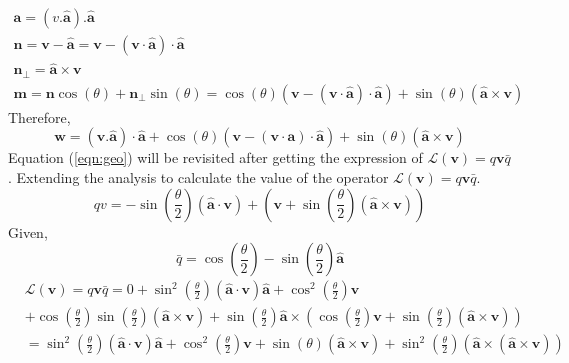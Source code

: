 \begin{equation*}
    \begin{gathered}
\boldsymbol{a}=(v . \widehat{\boldsymbol{a}}) . \widehat{\boldsymbol{a}} \\
\boldsymbol{n}=\boldsymbol{v}-\widehat{\boldsymbol{a}}=\boldsymbol{v}-(\boldsymbol{v} \cdot \widehat{\boldsymbol{a}}) \cdot \widehat{\boldsymbol{a}} \\
\boldsymbol{n}_{\perp}=\widehat{\boldsymbol{a}} \times \boldsymbol{v} \\
\boldsymbol{m}=\boldsymbol{n} \cos (\theta)+\boldsymbol{n}_{\perp} \sin (\theta)=\cos (\theta)(\boldsymbol{v}-(\boldsymbol{v} \cdot \widehat{\boldsymbol{a}}) \cdot \widehat{\boldsymbol{a}})+\sin (\theta)(\widehat{\boldsymbol{a}} \times \boldsymbol{v})
    \end{gathered}
\end{equation*}
Therefore,
\begin{equation}\label{eqn:geo}
    \boldsymbol{w}=(\boldsymbol{v} . \widehat{\boldsymbol{a}}) \cdot \widehat{\boldsymbol{a}}+\cos (\theta)(\boldsymbol{v}-(\boldsymbol{v} \cdot \boldsymbol{a}) \cdot \widehat{\boldsymbol{a}})+\sin (\theta)(\widehat{\boldsymbol{a}} \times \boldsymbol{v})
\end{equation}
Equation (\ref{eqn:geo}) will be revisited after getting the expression of $\mathcal{L}(\boldsymbol{v})=q\boldsymbol{v}\bar{q}$.
Extending the analysis to calculate the value of the operator $\mathcal{L}(\boldsymbol{v})=q\boldsymbol{v}\bar{q}$.
\begin{equation}
q v=-\sin \left(\frac{\theta}{2}\right)(\widehat{\boldsymbol{a}} \cdot \boldsymbol{v})+\left(\boldsymbol{v}+\sin \left(\frac{\theta}{2}\right)(\widehat{\boldsymbol{a}} \times \boldsymbol{v})\right)
\end{equation}
Given,
\begin{equation}
    \bar{q}=\cos \left(\frac{\theta}{2}\right)-\sin \left(\frac{\theta}{2}\right) \widehat{\boldsymbol{a}}
\end{equation}
\begin{equation*}
\begin{aligned}
&\mathcal{L}(\boldsymbol{v})=q \boldsymbol{v} \bar{q}=0+\sin ^{2}\left(\frac{\theta}{2}\right)(\widehat{\boldsymbol{a}} \cdot \boldsymbol{v}) \widehat{\boldsymbol{a}}+\cos ^{2}\left(\frac{\theta}{2}\right) \boldsymbol{v}\\
&+\cos \left(\frac{\theta}{2}\right) \sin \left(\frac{\theta}{2}\right)(\widehat{\boldsymbol{a}} \times \boldsymbol{v})+\sin \left(\frac{\theta}{2}\right) \widehat{\boldsymbol{a}} \times\left(\cos \left(\frac{\theta}{2}\right) \boldsymbol{v}+\sin \left(\frac{\theta}{2}\right)(\widehat{\boldsymbol{a}} \times \boldsymbol{v})\right)\\
&=\sin ^{2}\left(\frac{\theta}{2}\right)(\widehat{\boldsymbol{a}} \cdot \boldsymbol{v}) \widehat{\boldsymbol{a}}+\cos ^{2}\left(\frac{\theta}{2}\right) \boldsymbol{v}+\sin (\theta)(\widehat{\boldsymbol{a}} \times \boldsymbol{v})+\sin ^{2}\left(\frac{\theta}{2}\right)(\widehat{\boldsymbol{a}} \times(\widehat{\boldsymbol{a}} \times \boldsymbol{v}))\\
\end{aligned}
\end{equation*}
